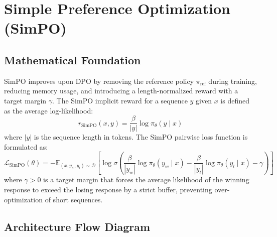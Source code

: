 \newpage
\section{Simple Preference Optimization (SimPO)}

\subsection{Mathematical Foundation}
SimPO improves upon DPO by removing the reference policy $\pi_{\text{ref}}$ during training, reducing memory usage, and introducing a length-normalized reward with a target margin $\gamma$.
The SimPO implicit reward for a sequence $y$ given $x$ is defined as the average log-likelihood:
\begin{equation}
  r_{\text{SimPO}}(x, y) = \frac{\beta}{|y|} \log \pi_\theta(y \mid x)
\end{equation}
where $|y|$ is the sequence length in tokens. The SimPO pairwise loss function is formulated as:
\begin{equation}
  \mathcal{L}_{\text{SimPO}}(\theta) = -\mathbb{E}_{(x, y_w, y_l) \sim \mathcal{D}} \left[ \log \sigma \left( \frac{\beta}{|y_w|} \log \pi_\theta(y_w \mid x) - \frac{\beta}{|y_l|} \log \pi_\theta(y_l \mid x) - \gamma \right) \right]
\end{equation}
where $\gamma > 0$ is a target margin that forces the average likelihood of the winning response to exceed the losing response by a strict buffer, preventing over-optimization of short sequences.

\subsection{Architecture Flow Diagram}

